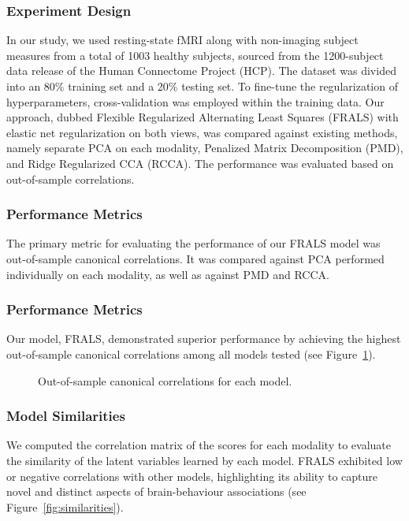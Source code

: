 \subsubsection{Experiment Design}
In our study, we used resting-state fMRI along with non-imaging subject measures from a total of 1003 healthy subjects, sourced from the 1200-subject data release of the Human Connectome Project (HCP). The dataset was divided into an 80\% training set and a 20\% testing set.
To fine-tune the regularization of hyperparameters, cross-validation was employed within the training data.
Our approach, dubbed Flexible Regularized Alternating Least Squares (FRALS) with elastic net regularization on both views, was compared against existing methods, namely separate PCA on each modality, Penalized Matrix Decomposition (PMD), and Ridge Regularized CCA (RCCA). The performance was evaluated based on out-of-sample correlations.

\subsubsection{Performance Metrics}
The primary metric for evaluating the performance of our FRALS model was out-of-sample canonical correlations.
It was compared against PCA performed individually on each modality, as well as against PMD and RCCA\@.

\subsubsection{Performance Metrics}
Our model, FRALS, demonstrated superior performance by achieving the highest out-of-sample canonical correlations among all models tested (see Figure~\ref{fig:performance}).

\begin{figure}[h]
\centering

\caption{Out-of-sample canonical correlations for each model.}
\label{fig:performance}
\end{figure}

\subsubsection{Model Similarities}
We computed the correlation matrix of the scores for each modality to evaluate the similarity of the latent variables learned by each model.
FRALS exhibited low or negative correlations with other models, highlighting its ability to capture novel and distinct aspects of brain-behaviour associations (see Figure~\ref{fig:similarities}).

